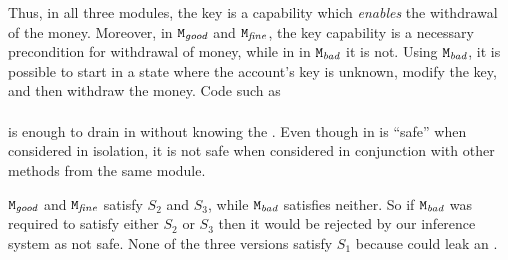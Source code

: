 {{\begin{example}
Thus, in all three modules, the key is a capability which \emph{enables} the withdrawal of the money. 
Moreover, in $\mbox{\normalfont{\texttt{M}}}_{{\textit{good}}}$ and $\mbox{\normalfont{\texttt{M}}}_{{\textit{fine}}}$, the key capability
is a necessary precondition for withdrawal of money, while in %
 in $\mbox{\normalfont{\texttt{M}}}_{{\textit{bad}}}$ it is not. %
Using $\mbox{\normalfont{\texttt{M}}}_{{\textit{bad}}}$, it is possible to start in a state where the account's key is unknown, modify the key, and then withdraw the money. 
Code   such as 
\\ 
$\ \strut \hspace{.2in} $  
\\ 
is enough to drain   in \ModB without knowing the \password.
Even though   in  \ModB is ``safe'' when considered in isolation, it is not safe when considered in conjunction with other methods from the same module. 

$\mbox{\normalfont{\texttt{M}}}_{{\textit{good}}}$ and $\mbox{\normalfont{\texttt{M}}}_{{\textit{fine}}}$ satisfy $S_2$ and $S_3$, while $\mbox{\normalfont{\texttt{M}}}_{{\textit{bad}}}$ satisfies neither. 
So if $\mbox{\normalfont{\texttt{M}}}_{{\textit{bad}}}$ was required to satisfy either $S_2$ or $S_3$ %
then it would  be rejected by our inference system as not safe.
None of the three versions satisfy $S_1$ because   could leak %
an .

\end{example}
 


}}
